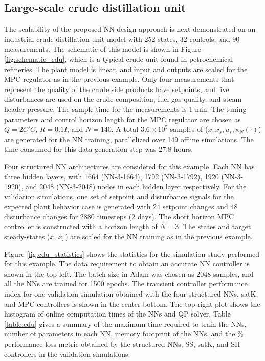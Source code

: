 \documentclass[preprint,5p, twocolumn, authoryear]{elsarticle}
\begin{document}
\subsection{Large-scale crude distillation unit}

The scalability of the proposed NN design approach is next demonstrated on an
industrial crude distillation unit model
\citep*{pannocchia:rawlings:wright:2007} with 252 states, 32 controls, and 90
measurements. The schematic of this model is shown in Figure
\ref{fig:schematic_cdu}, which is a typical crude unit found in petrochemical
refineries. The plant model is linear, and input and outputs are scaled for the
MPC regulator as in the previous example. Only four measurements that represent
the quality of the crude side products have setpoints, and five disturbances are
used on the crude composition, fuel gas quality, and steam header pressure. The
sample time for the measurements is 1 min. The tuning parameters and control
horizon length for the MPC regulator are chosen as $Q = 2C'C$, $R = 0.1I$, and
$N = 140$. A total $3.6 \times 10^5$ samples of ($x, x_s, u_s, \kappa_N(\cdot)$)
are generated for the NN training, parallelized over 149 offline simulations.
The time consumed for this data generation step was 27.8 hours.

Four structured NN architectures are considered for this example. Each NN has
three hidden layers, with 1664 (NN-3-1664), 1792 (NN-3-1792), 1920 (NN-3-1920),
and 2048 (NN-3-2048) nodes in each hidden layer respectively. For the validation
simulations, one set of setpoint and disturbance signals for the expected plant
behavior case is generated with 24 setpoint changes and 48 disturbance changes
for 2880 timesteps (2 days). The short horizon MPC controller is constructed
with a horizon length of $N = 3$. The states and target steady-states ($x$,
$x_s$) are scaled for the NN training as in the previous example. 

Figure \ref{fig:cdu_statistics} shows the statistics for the simulation study
performed for this example. The data requirement to obtain an accurate NN
controller is shown in the top left. The batch size in Adam was chosen as 2048
samples, and all the NNs are trained for 1500 epochs. The transient controller
performance index for one validation simulation obtained with the four
structured NNs, satK, and MPC controllers is shown in the center bottom. The top
right plot shows the histogram of online computation times of the NNs and QP
solver. Table \ref{table:cdu} gives a summary of the maximum time required to
train the NNs, number of parameters in each NN, memory footprint of the NNs, and
the $\%$ performance loss metric obtained by the structured NNs, SS, satK, and
SH controllers in the validation simulations. 
\end{document}
